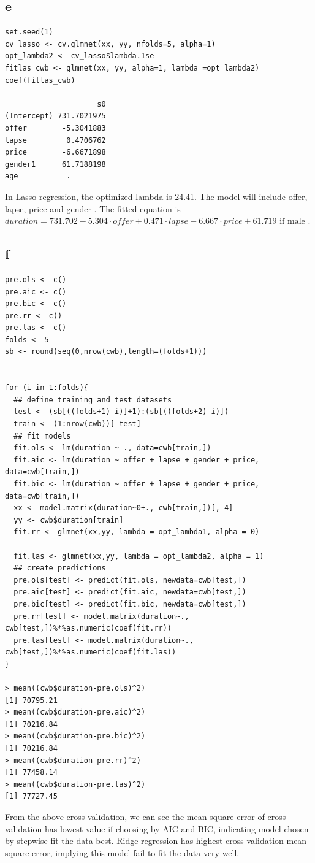\documentclass[11pt,letterpaper]{article}
\begin{document}
\subsection*{e}
\begin{verbatim}
set.seed(1)
cv_lasso <- cv.glmnet(xx, yy, nfolds=5, alpha=1)
opt_lambda2 <- cv_lasso$lambda.1se
fitlas_cwb <- glmnet(xx, yy, alpha=1, lambda =opt_lambda2)
coef(fitlas_cwb)

                     s0
(Intercept) 731.7021975
offer        -5.3041883
lapse         0.4706762
price        -6.6671898
gender1      61.7188198
age           .  
\end{verbatim}

\noindent In Lasso regression, the optimized lambda is 24.41. The model will include offer, lapse, price and gender . The fitted equation is $duration = 731.702 -  5.304 \cdot offer + 0.471 \cdot lapse - 6.667 \cdot price + 61.719 \text{ if male }$.

\subsection*{f}
\begin{verbatim}
pre.ols <- c() 
pre.aic <- c() 
pre.bic <- c() 
pre.rr <- c() 
pre.las <- c() 
folds <- 5
sb <- round(seq(0,nrow(cwb),length=(folds+1)))


for (i in 1:folds){
  ## define training and test datasets
  test <- (sb[((folds+1)-i)]+1):(sb[((folds+2)-i)]) 
  train <- (1:nrow(cwb))[-test]
  ## fit models
  fit.ols <- lm(duration ~ ., data=cwb[train,]) 
  fit.aic <- lm(duration ~ offer + lapse + gender + price, data=cwb[train,]) 
  fit.bic <- lm(duration ~ offer + lapse + gender + price, data=cwb[train,])
  xx <- model.matrix(duration~0+., cwb[train,])[,-4] 
  yy <- cwb$duration[train]
  fit.rr <- glmnet(xx,yy, lambda = opt_lambda1, alpha = 0) 
  
  fit.las <- glmnet(xx,yy, lambda = opt_lambda2, alpha = 1)
  ## create predictions
  pre.ols[test] <- predict(fit.ols, newdata=cwb[test,])
  pre.aic[test] <- predict(fit.aic, newdata=cwb[test,])
  pre.bic[test] <- predict(fit.bic, newdata=cwb[test,])
  pre.rr[test] <- model.matrix(duration~., cwb[test,])%*%as.numeric(coef(fit.rr)) 
  pre.las[test] <- model.matrix(duration~., cwb[test,])%*%as.numeric(coef(fit.las))
}

> mean((cwb$duration-pre.ols)^2) 
[1] 70795.21
> mean((cwb$duration-pre.aic)^2) 
[1] 70216.84
> mean((cwb$duration-pre.bic)^2) 
[1] 70216.84
> mean((cwb$duration-pre.rr)^2) 
[1] 77458.14
> mean((cwb$duration-pre.las)^2)
[1] 77727.45
\end{verbatim}

\noindent From the above cross validation, we can see the mean square error of cross validation has lowest value if choosing by AIC and BIC, indicating model chosen by stepwise fit the data best. Ridge regression has highest cross validation mean square error, implying this model fail to fit the data very well. 
\end{document}

